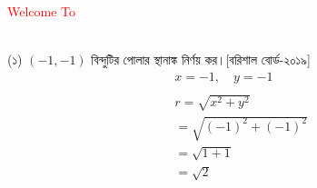 \documentclass{article}
\begin{document}
 
	\Large
	\textcolor{red}{Welcome To} 
	\\
	\\
  (১) $(-1,-1)$ বিন্দুটির পোলার স্থানাঙ্ক নির্ণয় কর।[বরিশাল বোর্ড-২০১৯]\\
  \begin{align*}
  & x=-1,\quad y=-1\\
  \\
 & r=\sqrt{x^2+y^2}\\
 & =\sqrt{(-1)^2+(-1)^2}\\
 & =\sqrt{1+1}\\
 & =\sqrt{2}\\ 
  \end{align*}
 
\end{document}
